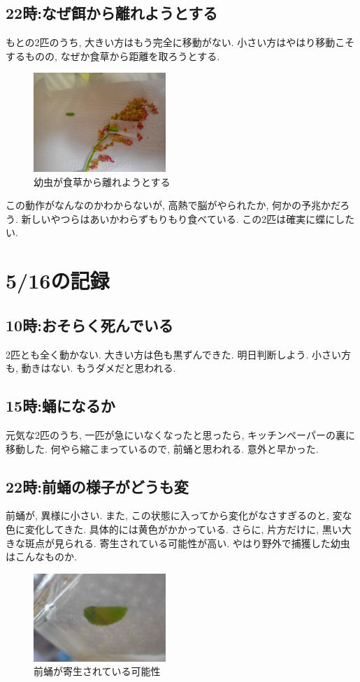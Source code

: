 \documentclass{jsarticle}
\begin{document}
\subsection{22時:なぜ餌から離れようとする}
もとの2匹のうち, 大きい方はもう完全に移動がない. 小さい方はやはり移動こそするものの, なぜか食草から距離を取ろうとする. 
\begin{figure}[htbp]
  \begin{center}
    \includegraphics[width=5cm]{photo3/LarvaAwayFromFeed.JPG}
  \end{center}
  \caption{幼虫が食草から離れようとする}
  \label{pic-LarvaAwayFromFeed}
\end{figure}
この動作がなんなのかわからないが, 高熱で脳がやられたか, 何かの予兆かだろう. 
新しいやつらはあいかわらずもりもり食べている. この2匹は確実に蝶にしたい. 

\section{5/16の記録}
\subsection{10時:おそらく死んでいる}
2匹とも全く動かない. 大きい方は色も黒ずんできた. 明日判断しよう. 
小さい方も, 動きはない. もうダメだと思われる. 

\subsection{15時:蛹になるか}
元気な2匹のうち, 一匹が急にいなくなったと思ったら, キッチンペーパーの裏に移動した. 
何やら縮こまっているので, 前蛹と思われる. 意外と早かった. 

\subsection{22時:前蛹の様子がどうも変}
前蛹が, 異様に小さい. また, この状態に入ってから変化がなさすぎるのと, 変な色に変化してきた. 
具体的には黄色がかかっている. さらに, 片方だけに, 黒い大きな斑点が見られる. 
寄生されている可能性が高い. やはり野外で捕獲した幼虫はこんなものか. 
\begin{figure}[htbp]
  \begin{center}
    \includegraphics[width=5cm]{photo3/Larva4_prePupa.JPG}
  \end{center}
  \caption{前蛹が寄生されている可能性}
\end{figure}
\end{document}
